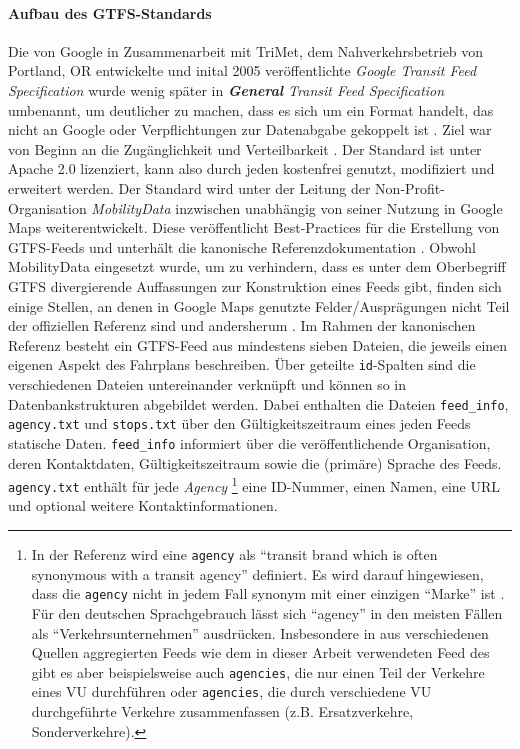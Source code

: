 \documentclass[11pt,pdftex,a4paper]{scrartcl}
\begin{document}
	\paragraph{Aufbau des GTFS-Standards}
	\label{par:GTFSStandard}
	Die von Google in Zusammenarbeit mit TriMet, dem Nahverkehrsbetrieb von Portland, OR entwickelte und inital 2005 veröffentlichte \textit{Google Transit Feed Specification} wurde wenig später in \textit{\textbf{General} Transit Feed Specification} umbenannt, um deutlicher zu machen, dass es sich um ein Format handelt, das nicht an Google oder Verpflichtungen zur Datenabgabe gekoppelt ist \parencites{gargPublicTransitGoogle}[132]{mchughPioneeringOpenData2013}. Ziel war von Beginn an die Zugänglichkeit und Verteilbarkeit \parencite[125]{mchughPioneeringOpenData2013}. Der Standard ist unter Apache 2.0 \parencite{apachefoundationApacheLicenseVersion2004} lizenziert, kann also durch jeden kostenfrei genutzt, modifiziert und erweitert werden. Der Standard wird unter der Leitung der Non-Profit-Organisation \textit{MobilityData} inzwischen unabhängig von seiner Nutzung in Google Maps weiterentwickelt. Diese veröffentlicht Best-Practices für die Erstellung von GTFS-Feeds und unterhält die kanonische Referenzdokumentation \parencite{mobilitydataGeneralTransitFeed2026}. Obwohl MobilityData eingesetzt wurde, um zu verhindern, dass es unter dem Oberbegriff GTFS divergierende Auffassungen zur Konstruktion eines Feeds gibt, finden sich einige Stellen, an denen in Google Maps genutzte Felder/Ausprägungen nicht Teil der offiziellen Referenz sind und andersherum \parencite[vgl.]{googletransitGoogleTransitGTFSUnterschiede}. Im Rahmen der kanonischen Referenz besteht ein GTFS-Feed aus mindestens sieben Dateien, die jeweils einen eigenen Aspekt des Fahrplans beschreiben. Über geteilte \texttt{id}-Spalten sind die verschiedenen Dateien untereinander verknüpft und können so in Datenbankstrukturen abgebildet werden.
	Dabei enthalten die Dateien \texttt{feed\_info}, \texttt{agency.txt} und \texttt{stops.txt} über den Gültigkeitszeitraum eines jeden Feeds statische Daten.
	\texttt{feed\_info} informiert über die veröffentlichende Organisation, deren Kontaktdaten, Gültigkeitszeitraum sowie die (primäre) Sprache des Feeds.
	\texttt{agency.txt} enthält für jede \textit{Agency}
		\footnote{In der Referenz wird eine \texttt{agency} als \enquote{transit brand which is often synonymous with a transit agency} definiert. Es wird darauf hingewiesen, dass die \texttt{agency} nicht in jedem Fall synonym mit einer einzigen \enquote{Marke} ist \parencite{mobilitydataGeneralTransitFeed2026}. Für den deutschen Sprachgebrauch lässt sich \enquote{agency} in den meisten Fällen als \enquote{Verkehrsunternehmen} ausdrücken. Insbesondere in aus verschiedenen Quellen aggregierten Feeds wie dem in dieser Arbeit verwendeten Feed des \textcite{delfie.v.DeutschlandweiteSollFahrplandatenGTFS2026} gibt es aber beispielsweise auch \texttt{agencies}, die nur einen Teil der Verkehre eines VU durchführen oder \texttt{agencies}, die durch verschiedene VU durchgeführte Verkehre zusammenfassen (z.B. Ersatzverkehre, Sonderverkehre).}
	eine ID-Nummer, einen Namen, eine URL und optional weitere Kontaktinformationen.
	
\end{document}
